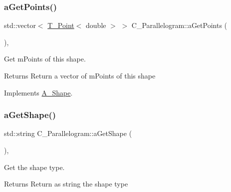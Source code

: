\mbox{\label{classC__Parallelogram_ae75f316315134020e8423feff917828e}} 
\subsubsection{\texorpdfstring{a\+Get\+Points()}{aGetPoints()}\hspace{0.1cm}{\footnotesize\ttfamily [2/2]}}
{\footnotesize\ttfamily std\+::vector$<$ \hyperlink{classT__Point}{T\+\_\+\+Point}$<$ double $>$ $>$ C\+\_\+\+Parallelogram\+::a\+Get\+Points (\begin{DoxyParamCaption}{ }\end{DoxyParamCaption})\hspace{0.3cm}{\ttfamily [override]}, {\ttfamily [virtual]}}



Get m\+Points of this shape. 

\begin{DoxyReturn}{Returns}
Return a vector of m\+Points of this shape 
\end{DoxyReturn}


Implements \hyperlink{classA__Shape_a9fd1285bd63b1fc88943c9969bf01a5c}{A\+\_\+\+Shape}.

\mbox{\label{classC__Parallelogram_a373fdd3ebdfeffcaa0a72ff7001af8ec}} 
\subsubsection{\texorpdfstring{a\+Get\+Shape()}{aGetShape()}\hspace{0.1cm}{\footnotesize\ttfamily [1/2]}}
{\footnotesize\ttfamily std\+::string C\+\_\+\+Parallelogram\+::a\+Get\+Shape (\begin{DoxyParamCaption}{ }\end{DoxyParamCaption})\hspace{0.3cm}{\ttfamily [override]}, {\ttfamily [virtual]}}



Get the shape type. 

\begin{DoxyReturn}{Returns}
Return as string the shape type 
\end{DoxyReturn}


